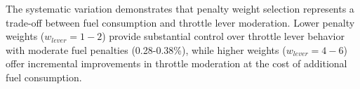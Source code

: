 The systematic variation demonstrates that penalty weight selection represents a trade-off between fuel consumption and throttle lever moderation. Lower penalty weights ($w_{lever} = 1-2$) provide substantial control over throttle lever behavior with moderate fuel penalties (0.28-0.38\%), while higher weights ($w_{lever} = 4-6$) offer incremental improvements in throttle moderation at the cost of additional fuel consumption.  
